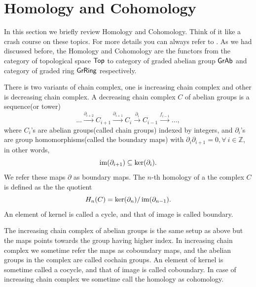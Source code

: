 
\newpage
\section{Homology and Cohomology}

In this section we briefly review Homology and Cohomology.
Think of it like a crash course on these topics.
For more details you can always refer to \cite{Hatcher2002}. 
As we had discussed before, the Homology and Cohomology are the functors from the category of topological space \(\mathsf{Top}\) to category of graded abelian group \(\mathsf{GrAb}\) and category of graded ring \(\mathsf{GrRing}\) respectively.

There is two variants of chain complex, one is increasing chain complex and other is decreasing chain complex.
A decreasing chain complex \(C\) of abelian groups is a sequence(or tower) 
\[\dots \xrightarrow{\partial_{i+2}} C_{i+1} \xrightarrow{\partial_{i+1}} C_{i} \xrightarrow{\partial_{i}} C_{i-1} \xrightarrow{f_{i-1}} \dots,\]
where \(C_i\)'s are abelian groups(called chain groups) indexed by integers, and \(\partial_i\)'s are group homomorphisms(called the boundary maps) with \(\partial_{i}\partial_{i+1} = 0, \forall\ i \in \mathbb Z\), in other words,
\[\operatorname{im}(\partial_{i+1}) \subseteq\ker(\partial_{i}).\]
We refer these maps \(\partial\) as boundary maps.
The \(n\)-th homology of a the complex \(C\) is defined as the the quotient
\[H_n(C) = \ker(\partial_n)/\operatorname{im}(\partial_{n-1}).\]
An element of kernel is called a cycle, and that of image is called boundary. 

The increasing chain complex of abelian groups is the same setup as above but the maps points towards the group having higher index.
In increasing chain complex we sometime refer the maps as coboundary maps, and the abelian groups in the complex are called cochain groups.
An element of kernel is sometime called a cocycle, and that of image is called coboundary.
In case of increasing chain complex we sometime call the homology as cohomology.

